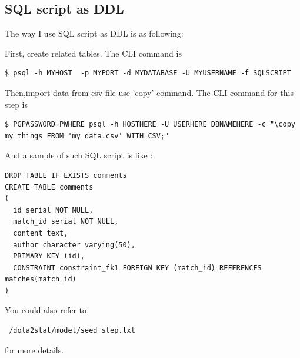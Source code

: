 \documentclass[a4paper]{article}
\begin{document}
\subsection{SQL script as DDL}
The way I use SQL script as DDL is as following: \par
\noindent First, create related tables. The CLI command is
\begin{lstlisting}
$ psql -h MYHOST  -p MYPORT -d MYDATABASE -U MYUSERNAME -f SQLSCRIPT
\end{lstlisting}
Then,import data from csv file use 'copy' command. The CLI command for this step is 
\begin{lstlisting}
$ PGPASSWORD=PWHERE psql -h HOSTHERE -U USERHERE DBNAMEHERE -c "\copy my_things FROM 'my_data.csv' WITH CSV;"
\end{lstlisting}
And a sample of such SQL script is like : 
\begin{lstlisting}
DROP TABLE IF EXISTS comments
CREATE TABLE comments
(
  id serial NOT NULL,
  match_id serial NOT NULL,
  content text,
  author character varying(50),
  PRIMARY KEY (id),
  CONSTRAINT constraint_fk1 FOREIGN KEY (match_id) REFERENCES matches(match_id)
)
\end{lstlisting}
You could also refer to
\begin{lstlisting}
 /dota2stat/model/seed_step.txt
\end{lstlisting}
for more details.
\end{document}
